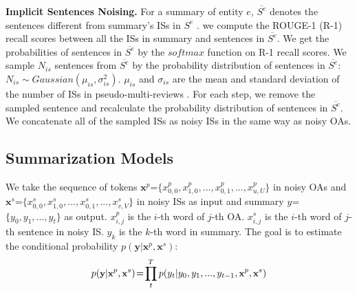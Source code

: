 {\textbf{Implicit Sentences Noising.}
For a summary of entity $e$, 
$\overline{S^e}$ denotes the sentences different from summary's ISs
in $S^e$ .
we compute the ROUGE-1 (R-1) recall scores between all the ISs in summary
and sentences in $\overline{S^e}$.
We get the probabilities of sentences in $\overline{S^e}$
by the $softmax$ function on R-1 recall scores. 
We sample $N_{is}$ sentences from $\overline{S^e}$ by
the probability distribution of sentences in $\overline{S^e}$:
$N_{is} \sim Gaussian(\mu_{is}, \sigma_{is}^2)$.
$\mu_{is}$ and $\sigma_{is}$ are the mean and standard deviation of 
the number of ISs in pseudo-multi-reviews .
For each step, we remove the sampled sentence and recalculate the probability distribution of sentences in $\overline{S^e}$.
We concatenate all of the sampled ISs as noisy ISs
in the same way as noisy OAs. 

\subsection{Summarization Models}
We take the sequence of tokens  $\textbf{x}^p$=$\{x^p_{0,0},x^p_{1,0},...,x^p_{0,1},...,x^p_{u,U}\}$ in noisy OAs
and $\textbf{x}^s$=$\{x^s_{0,0},x^s_{1,0},...,x^s_{0,1},...,x^s_{v,V}\}$ in noisy ISs
as input and summary $y$=$\{y_0, y_1,..., y_t\}$ as output.
$x^p_{i,j}$ is the $i$-th word of $j$-th OA.
$x^s_{i,j}$ is the $i$-th word of $j$-th sentence in noisy IS.
$y_k$ is the $k$-th word in summary.
The goal is to estimate the conditional probability
$p(\textbf{y}|\textbf{x}^p, \textbf{x}^s)$:
\begin{equation}
	\small
p(\textbf{y}|\textbf{x}^p, \textbf{x}^s) \!=\! 
{\prod^T_{t} {p(y_{t} | y_{0}, y_{1},..., y_{t-1}, \textbf{x}^p, \textbf{x}^s)}}                             
\end{equation}


}
